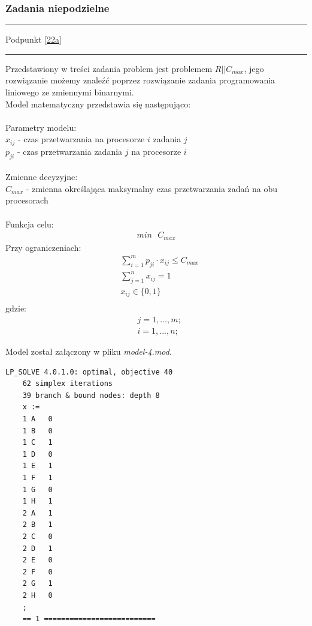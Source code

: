 \documentclass[
    12pt, %
]{../fphw}
\begin{document}
\subsubsection{Zadania niepodzielne}
\par\noindent\rule{\textwidth}{0.4pt}
Podpunkt \ref{22a}
\par\noindent\rule{\textwidth}{0.4pt}
Przedstawiony w treści zadania problem jest problemem \(R||C_{max}\),
jego rozwiązanie możemy znaleźć poprzez rozwiązanie zadania programowania liniowego
ze zmiennymi binarnymi. \\
Model matematyczny przedstawia się następująco: \\ \\
Parametry modelu: \\
\(x_{ij}\) - czas przetwarzania na procesorze \(i\) zadania \(j\) \\
\(p_{ji}\) - czas przetwarzania zadania \(j\) na procesorze \(i\) \\ \\
Zmienne decyzyjne: \\
\(C_{max}\) - zmienna określająca maksymalny czas przetwarzania zadań na obu procesorach \\ \\
Funkcja celu: \\
\begin{align*}
    min \text{ } C_{max}
\end{align*}
Przy ograniczeniach: \\
\begin{align*}
     & \sum^m_{i=1} p_{ji} \cdot x_{ij} \leq C_{max} \\
     & \sum^n_{j=1} x_{ij} = 1                       \\
     & x_{ij} \in  \{0,1\}                           \\
\end{align*}
gdzie:
\begin{align*}
     & j = 1, ..., m; \\
     & i = 1, ..., n;
\end{align*}

\newpage

Model został załączony w pliku \textit{model-4.mod}.


\begin{lstlisting}[caption=Rozwiązanie znalezione solwerem lpsolve]
    LP_SOLVE 4.0.1.0: optimal, objective 40
    62 simplex iterations
    39 branch & bound nodes: depth 8
    x :=
    1 A   0
    1 B   0
    1 C   1
    1 D   0
    1 E   1
    1 F   1
    1 G   0
    1 H   1
    2 A   1
    2 B   1
    2 C   0
    2 D   1
    2 E   0
    2 F   0
    2 G   1
    2 H   0
    ;
    == 1 ==========================  
\end{lstlisting}
\end{document}
